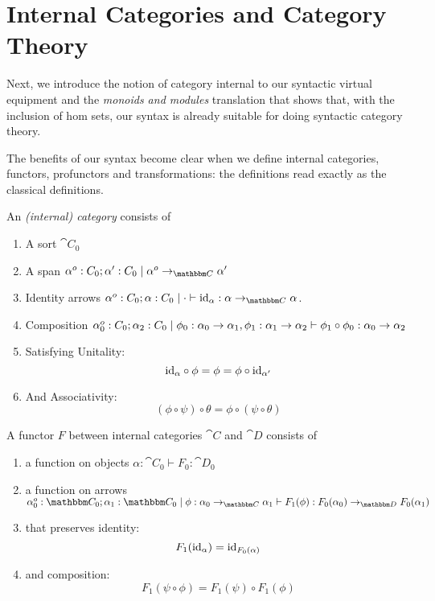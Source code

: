 \documentclass{article}
\begin{document}
\section{Internal Categories and Category Theory}

Next, we introduce the notion of category internal to our syntactic
virtual equipment and the \emph{monoids and modules} translation that
shows that, with the inclusion of hom sets, our syntax is already
suitable for doing syntactic category theory.

The benefits of our syntax become clear when we define internal
categories, functors, profunctors and transformations: the definitions
read exactly as the classical definitions.
\begin{definition}
  An \emph{(internal) category} consists of
  \begin{enumerate}
  \item A sort $\cat C_0$
  \item A span $\alpha^o:C_0;\alpha' : C_0 \pipe \alpha^o \to_{\cat C} \alpha'$
  \item Identity arrows $\alpha^o : C_0; \alpha : C_0 \pipe \cdot
    \vdash \id_{\alpha} : \alpha \to_{\cat C} \alpha$.
  \item Composition $\alpha_0^o:C_0;\alpha_2:C_0\mathrel{|} \phi_0 :
    \alpha_0 \to \alpha_1, \phi_1 : \alpha_1 \to \alpha_2 \vdash
    \phi_1 \circ \phi_0 : \alpha_0 \to \alpha_2$
  \item Satisfying Unitality:
    \[ \text{id}_{\alpha} \circ \phi = \phi = \phi \circ \text{id}_{\alpha'}\]
  \item And Associativity:
    \[ (\phi \circ \psi) \circ \theta = \phi \circ (\psi \circ \theta) \]
  \end{enumerate}
\end{definition}

\begin{definition}
  A functor $F$ between internal categories $\cat C$ and $\cat D$ consists of
  \begin{enumerate}
  \item a function on objects $\alpha : \cat C_0 \vdash F_0 : \cat D_0$
  \item a function on arrows $\alpha_0^o : \cat C_0; \alpha_1 : \cat C_0\pipe \phi:\alpha_0 \to_{\cat C} \alpha_1 \vdash F_1(\phi) : F_0(\alpha_0) \to_{\cat D} F_0(\alpha_1)$
  \item that preserves identity:
    \[ F_1(\text{id}_{\alpha}) = \text{id}_{F_0(\alpha)}\]
  \item and composition:
    \[ F_1(\psi \circ \phi) = F_1(\psi) \circ F_1(\phi) \]
  \end{enumerate}
\end{definition}
\end{document}
